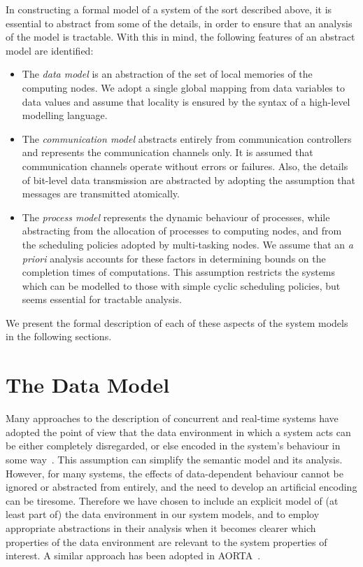 In constructing a formal model of a system of the sort described
above, it is essential to abstract from some of the details, in order
to ensure that an analysis of the model is tractable. With this in
mind, the following features of an abstract model are identified:
\begin{itemize}
\item The \emph{data model} is an abstraction of the 
  set of local memories of the computing nodes. We adopt a single
  global mapping from data variables to data values and assume that
  locality is ensured by the syntax of a high-level modelling language.
\item The \emph{communication model} abstracts entirely from communication
  controllers and represents the communication channels only. It is
  assumed that communication channels operate without errors or
  failures. Also, the details of bit-level data transmission are
  abstracted by adopting the assumption that messages are transmitted
  atomically.
\item  The \emph{process model} represents the dynamic behaviour of
  processes, while abstracting from the allocation of processes to
  computing nodes, and from the scheduling policies adopted by
  multi-tasking nodes. We assume that an \emph{a priori} analysis 
  accounts for these factors in determining bounds on the completion
  times of computations. This assumption restricts the systems
  which can be modelled to those with simple cyclic scheduling policies,
  but seems essential for tractable analysis.
\end{itemize}
We present the formal description of each of these aspects of 
the system models in the following sections.

\section{The Data Model \label{sec:bcdata}}
Many approaches to the description of concurrent and real-time systems
have adopted the point of view that the data environment in which a
system acts can be either completely disregarded, or else encoded in
the system's behaviour in some way~\cite{mil:89,dav:93}.  This
assumption can simplify the semantic model and its analysis. However,
for many systems, the effects of data-dependent behaviour cannot be
ignored or abstracted from entirely, and the need to develop an
artificial encoding can be tiresome. Therefore we have chosen to
include an explicit model of (at least part of) the data environment in
our system models, and to employ appropriate abstractions 
in their analysis when it becomes clearer which properties of
the data environment are relevant to the system properties of
interest. A similar approach has been adopted in AORTA~\cite{bhkr:01}.

